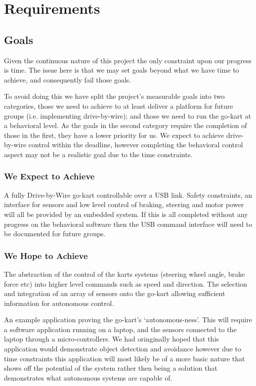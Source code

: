 \chapter{Requirements}
\section{Goals}
Given the continuous nature of this project the only constraint upon our progress is time. The issue here is that we may set goals beyond what we have time to achieve, and consequently fail those goals.

To avoid doing this we have split the project's measurable goals into two categories, those we need to achieve to at least deliver a platform for future groups (i.e. implementing drive-by-wire); and those we need to run the go-kart at a behavioral level. As the goals in the second category require the completion of those in the first, they have a lower priority for us. We expect to achieve drive-by-wire control within the deadline, however completing the behavioral control aspect may not be a realistic goal due to the time constraints.

\subsection{We Expect to Achieve}
A fully Drive-by-Wire go-kart controllable over a USB link. Safety constraints, an interface for sensors and low level control of braking, steering and motor power will all be provided by an embedded system. If this is all completed without any progress on the behavioral software then the USB command interface will need to be documented for future groups.

\subsection{We Hope to Achieve}
The abstraction of the control of the karts systems (steering wheel angle, brake force etc) into higher level commands such as speed and direction. The selection and integration of an array of sensors onto the go-kart allowing sufficient information for autonomous control.

An example application proving the go-kart's `autonomous-ness'. This will require a software application running on a laptop, and the sensors connected to the laptop through a micro-controllers. We had oringinally hoped that this application would demonstrate object detection and avoidance however due to time constraints this application will most likely be of a more basic nature that shows off the potential of the system rather then being a solution that demonstrates what autonomous systems are capable of.

